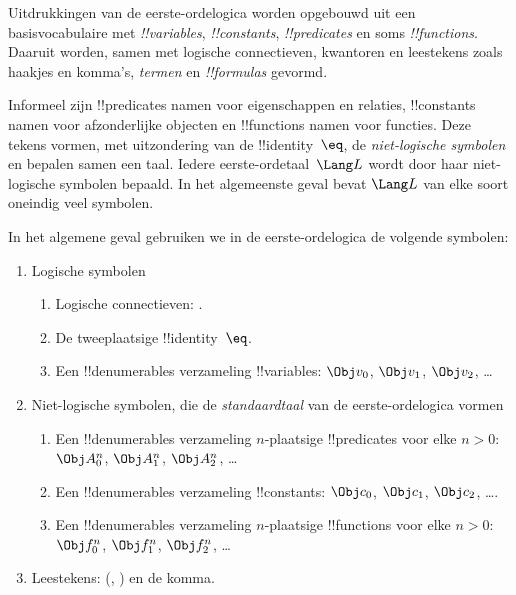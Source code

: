 \documentclass[../../../include/open-logic-section]{subfiles}
\begin{document}



Uitdrukkingen van de eerste-ordelogica worden opgebouwd uit een
basisvocabulaire met \emph{!!{variable}s}, \emph{!!{constant}s},
\emph{!!{predicate}s} en soms \emph{!!{function}s}. Daaruit worden,
samen met logische connectieven, kwantoren en leestekens zoals haakjes
en komma's, \emph{termen} en \emph{!!{formula}s} gevormd.

\begin{explain}
Informeel zijn !!{predicate}s namen voor eigenschappen en relaties,
!!{constant}s namen voor afzonderlijke objecten en !!{function}s namen
voor functies. Deze tekens vormen, met uitzondering van de
!!{identity}~$\eq$, de \emph{niet-logische symbolen} en bepalen samen
een taal. Iedere eerste-ordetaal~$\Lang L$ wordt door haar
niet-logische symbolen bepaald. In het algemeenste geval bevat
$\Lang L$ van elke soort oneindig veel symbolen.
\end{explain}

In het algemene geval gebruiken we in de eerste-ordelogica de volgende
symbolen:

\begin{enumerate}
\item Logische symbolen
\begin{enumerate}
\item Logische connectieven:
  \startycommalist
  .
\item De tweeplaatsige !!{identity}~$\eq$.
\item Een !!{denumerable}s verzameling !!{variable}s: $\Obj v_0$, $\Obj v_1$, $\Obj
  v_2$, \dots
\end{enumerate}
\item Niet-logische symbolen, die de \emph{standaardtaal} van de
  eerste-ordelogica vormen
\begin{enumerate}
\item Een !!{denumerable}s verzameling $n$-plaatsige !!{predicate}s voor elke $n>0$: $\Obj
  A^n_0$, $\Obj A^n_1$, $\Obj A^n_2$, \dots
\item Een !!{denumerable}s verzameling !!{constant}s: $\Obj c_0$, $\Obj c_1$, $\Obj
  c_2$, \dots.
\item Een !!{denumerable}s verzameling $n$-plaatsige !!{function}s voor elke $n>0$:
  $\Obj f^n_0$, $\Obj f^n_1$, $\Obj f^n_2$, \dots
\end{enumerate}
\item Leestekens: (, ) en de komma.
\end{enumerate}
\end{document}

